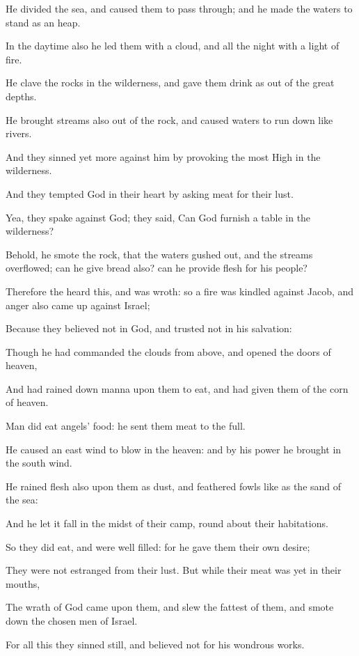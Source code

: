 \verse He divided the sea, and caused them to pass through; and he made the waters to stand as an heap.

\verse In the daytime also he led them with a cloud, and all the night with a light of fire.

\verse He clave the rocks in the wilderness, and gave them drink as out of the great depths.

\verse He brought streams also out of the rock, and caused waters to run down like rivers.

\verse And they sinned yet more against him by provoking the most High in the wilderness.

\verse And they tempted God in their heart by asking meat for their lust.

\verse Yea, they spake against God; they said, Can God furnish a table in the wilderness?

\verse Behold, he smote the rock, that the waters gushed out, and the streams overflowed; can he give bread also? can he provide flesh for his people?

\verse Therefore the \LORD heard this, and was wroth: so a fire was kindled against Jacob, and anger also came up against Israel;

\verse Because they believed not in God, and trusted not in his salvation:

\verse Though he had commanded the clouds from above, and opened the doors of heaven,

\verse And had rained down manna upon them to eat, and had given them of the corn of heaven.

\verse Man did eat angels' food: he sent them meat to the full.

\verse He caused an east wind to blow in the heaven: and by his power he brought in the south wind.

\verse He rained flesh also upon them as dust, and feathered fowls like as the sand of the sea:

\verse And he let it fall in the midst of their camp, round about their habitations.

\verse So they did eat, and were well filled: for he gave them their own desire;

\verse They were not estranged from their lust. But while their meat was yet in their mouths,

\verse The wrath of God came upon them, and slew the fattest of them, and smote down the chosen men of Israel.

\verse For all this they sinned still, and believed not for his wondrous works.

